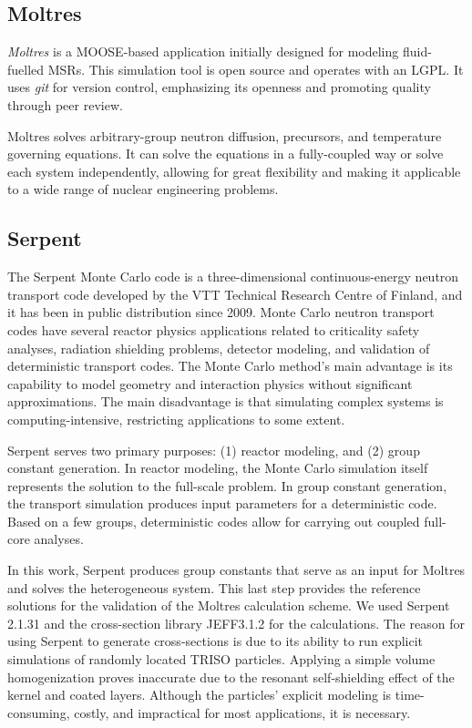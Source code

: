 \subsection{Moltres}

\textit{Moltres} \cite{lindsay_introduction_2018} is a MOOSE-based application initially designed for modeling fluid-fuelled \glspl{MSR}.
This simulation tool is open source and operates with an LGPL.
It uses \textit{git} for version control, emphasizing its openness and promoting quality through peer review.

Moltres solves arbitrary-group neutron diffusion, precursors, and temperature governing equations.
It can solve the equations in a fully-coupled way or solve each system independently, allowing for great flexibility and making it applicable to a wide range of nuclear engineering problems.

\subsection{Serpent}

The Serpent Monte Carlo code \cite{leppanen_development_2007} \cite{leppanen_calculation_2014} is a three-dimensional continuous-energy neutron transport code developed by the VTT Technical Research Centre of Finland, and it has been in public distribution since 2009.
Monte Carlo neutron transport codes have several reactor physics applications related to criticality safety analyses, radiation shielding problems, detector modeling, and validation of deterministic transport codes.
The Monte Carlo method's main advantage is its capability to model geometry and interaction physics without significant approximations.
The main disadvantage is that simulating complex systems is computing-intensive, restricting applications to some extent.

Serpent serves two primary purposes: (1) reactor modeling, and (2) group constant generation.
In reactor modeling, the Monte Carlo simulation itself represents the solution to the full-scale problem.
In group constant generation, the transport simulation produces input parameters for a deterministic code.
Based on a few groups, deterministic codes allow for carrying out coupled full-core analyses.

In this work, Serpent produces group constants that serve as an input for Moltres and solves the heterogeneous system.
This last step provides the reference solutions for the validation of the Moltres calculation scheme.
We used Serpent 2.1.31 and the cross-section library JEFF3.1.2 for the calculations.
The reason for using Serpent to generate cross-sections is due to its ability to run explicit simulations of randomly located TRISO particles.
Applying a simple volume homogenization proves inaccurate due to the resonant self-shielding effect of the kernel and coated layers.
Although the particles' explicit modeling is time-consuming, costly, and impractical for most applications, it is necessary.

